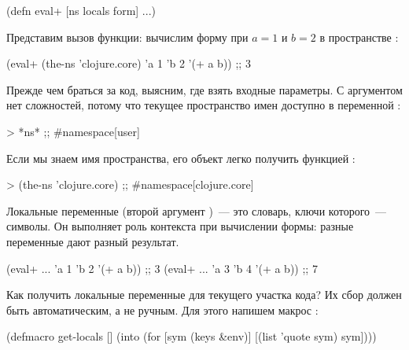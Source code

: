 \begin{english}
  \begin{clojure}
(defn eval+ [ns locals form]
  ...)
  \end{clojure}
\end{english}

Представим вызов функции: вычислим форму  при $a = 1$ и $b = 2$ в пространстве :

\begin{english}
  \begin{clojure}
(eval+ (the-ns 'clojure.core)
       {'a 1 'b 2}
       '(+ a b))
;; 3
  \end{clojure}
\end{english}

Прежде чем браться за код, выясним, где взять входные параметры. С аргументом  нет сложностей, потому что текущее пространство имен доступно в переменной :

\begin{english}
  \begin{clojure}
> *ns*
;; #namespace[user]
  \end{clojure}
\end{english}

Если мы знаем имя пространства, его объект легко получить функцией :

\begin{english}
  \begin{clojure}
> (the-ns 'clojure.core)
;; #namespace[clojure.core]
  \end{clojure}
\end{english}

Локальные переменные (второй аргумент )~--- это словарь, ключи которого~--- символы. Он выполняет роль контекста при вычислении формы: разные переменные дают разный результат.

\begin{english}
  \begin{clojure}
(eval+ ... {'a 1 'b 2} '(+ a b)) ;; 3
(eval+ ... {'a 3 'b 4} '(+ a b)) ;; 7
  \end{clojure}
\end{english}

Как получить локальные переменные для текущего участка кода? Их сбор должен быть автоматическим, а не ручным. Для этого напишем макрос :

\begin{english}
  \begin{clojure/lines}
(defmacro get-locals []
  (into {} (for [sym (keys &env)]
             [(list 'quote sym) sym])))
  \end{clojure/lines}
\end{english}

